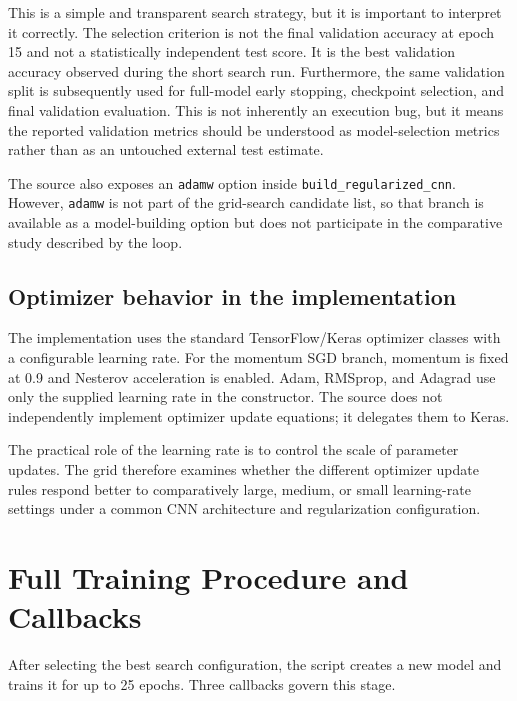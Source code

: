 \documentclass[11pt,a4paper]{article}
\newcommand{\code}[1]{\texttt{#1}}
\begin{document}
This is a simple and transparent search strategy, but it is important to interpret it correctly. The selection criterion is not the final validation accuracy at epoch 15 and not a statistically independent test score. It is the best validation accuracy observed during the short search run. Furthermore, the same validation split is subsequently used for full-model early stopping, checkpoint selection, and final validation evaluation. This is not inherently an execution bug, but it means the reported validation metrics should be understood as model-selection metrics rather than as an untouched external test estimate.

The source also exposes an \code{adamw} option inside \code{build\_regularized\_cnn}. However, \code{adamw} is not part of the grid-search candidate list, so that branch is available as a model-building option but does not participate in the comparative study described by the loop.

\subsection{Optimizer behavior in the implementation}
The implementation uses the standard TensorFlow/Keras optimizer classes with a configurable learning rate. For the momentum SGD branch, momentum is fixed at 0.9 and Nesterov acceleration is enabled. Adam, RMSprop, and Adagrad use only the supplied learning rate in the constructor. The source does not independently implement optimizer update equations; it delegates them to Keras.

The practical role of the learning rate is to control the scale of parameter updates. The grid therefore examines whether the different optimizer update rules respond better to comparatively large, medium, or small learning-rate settings under a common CNN architecture and regularization configuration.

\section{Full Training Procedure and Callbacks}
After selecting the best search configuration, the script creates a new model and trains it for up to 25 epochs. Three callbacks govern this stage.
\end{document}
